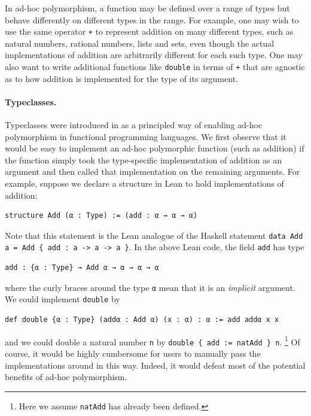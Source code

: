 \documentclass[runningheads]{llncs}
\newcommand{\icode}[1]{\texttt{\small #1}}
\begin{document}
In ad-hoc polymorphism, a function may be defined over a range of types but behave differently on different types in the range.
For example, one may wish to use the same operator \icode{+} to represent addition on many different types, such as natural numbers, rational numbers,
lists and sets, even though the actual implementations of addition are arbitrarily different for each such type. One may also want to write
additional functions like \lstinline{double} in terms of \icode{+} that are agnostic as to how addition is implemented for the type of its argument.

\paragraph{Typeclasses.}
Typeclasses were introduced in \cite{wadler1989make} as a principled way
of enabling ad-hoc polymorphism in functional programming languages.
We first observe that it would be easy to implement
an ad-hoc polymorphic function (such as addition)
if the function simply took the type-specific implementation
of addition as an argument and then called that implementation on the remaining arguments.
For example, suppose we declare a structure in Lean to hold implementations of addition:
\begin{lstlisting}
structure Add (α : Type) := (add : α → α → α)
\end{lstlisting}
Note that this statement is the Lean analogue of the Haskell statement \icode{data Add a = Add \{ add : a -> a -> a \}}. In the above Lean code, the field \lstinline{add} has type
\begin{lstlisting}
add : {α : Type} → Add α → α → α → α
\end{lstlisting}
where the curly braces around the type \lstinline{α} mean that it is an \emph{implicit} argument.
We could implement \lstinline{double} by
\begin{lstlisting}
def double {α : Type} (addα : Add α) (x : α) : α := add addα x x
\end{lstlisting}
and we could double a natural number \lstinline{n} by \lstinline|double { add := natAdd } n|.%
\footnote{Here we assume \lstinline{natAdd} has already been defined.}
Of course, it would be highly cumbersome for users to manually pass the implementations around in this way.
Indeed, it would defeat most of the potential benefits of ad-hoc polymorphism.
\end{document}
